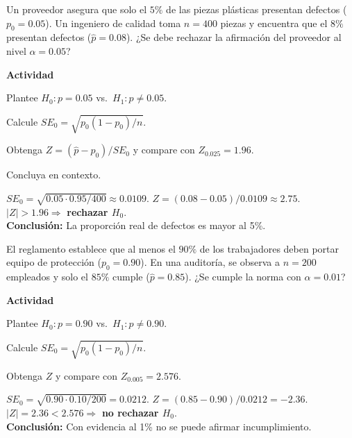 \begin{ejercicio}[Defectos en piezas inyectadas (n=400)]
Un proveedor asegura que solo el $5\%$ de las piezas plásticas presentan defectos ($p_0=0.05$).
Un ingeniero de calidad toma $n=400$ piezas y encuentra que el $8\%$ presentan defectos ($\hat p=0.08$).
¿Se debe rechazar la afirmación del proveedor al nivel $\alpha=0.05$?


\textbf{Actividad}
\begin{pasos}
  \item Plantee $H_0: p=0.05$ vs.\ $H_1: p\neq0.05$.
  \item Calcule $SE_0=\sqrt{p_0(1-p_0)/n}$.
  \item Obtenga $Z=(\hat p - p_0)/SE_0$ y compare con $Z_{0.025}=1.96$.
  \item Concluya en contexto.
\end{pasos}

\begin{clave}
$SE_0=\sqrt{0.05\cdot0.95/400}\approx0.0109$. \;
$Z=(0.08-0.05)/0.0109\approx2.75$. \;
$|Z|>1.96 \Rightarrow$ \textbf{rechazar $H_0$}.\\
\textbf{Conclusión:} La proporción real de defectos es mayor al 5\%.
\end{clave}
\end{ejercicio}


\begin{ejercicio}[Uso de EPP en planta (n=200)]
El reglamento establece que al menos el $90\%$ de los trabajadores deben portar equipo de protección ($p_0=0.90$).
En una auditoría, se observa a $n=200$ empleados y solo el $85\%$ cumple ($\hat p=0.85$).
¿Se cumple la norma con $\alpha=0.01$?


\textbf{Actividad}
\begin{pasos}
  \item Plantee $H_0: p=0.90$ vs.\ $H_1: p\neq0.90$.
  \item Calcule $SE_0=\sqrt{p_0(1-p_0)/n}$.
  \item Obtenga $Z$ y compare con $Z_{0.005}=2.576$.
\end{pasos}

\begin{clave}
$SE_0=\sqrt{0.90\cdot0.10/200}=0.0212$. \;
$Z=(0.85-0.90)/0.0212=-2.36$. \;
$|Z|=2.36<2.576 \Rightarrow$ \textbf{no rechazar $H_0$}.\\
\textbf{Conclusión:} Con evidencia al 1\% no se puede afirmar incumplimiento.
\end{clave}
\end{ejercicio}


